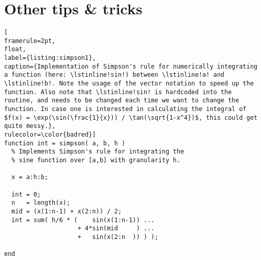 \newpage
\section{Other tips \& tricks}

%
%
%


\begin{lstlisting}[
framerule=2pt,
float,
label={listing:simpson1},
caption={Implementation of Simpson's rule for numerically integrating a function (here: \lstinline!sin!) between \lstinline!a! and \lstinline!b!. Note the usage of the vector notation to speed up the function. Also note that \lstinline!sin! is hardcoded into the routine, and needs to be changed each time we want to change the function. In case one is interested in calculating the integral of $f(x) = \exp(\sin(\frac{1}{x})) / \tan(\sqrt{1-x^4})$, this could get quite messy.},
rulecolor=\color{badred}]
function int = simpson( a, b, h )
  % Implements Simpson's rule for integrating the
  % sine function over [a,b] with granularity h.

  x = a:h:b;

  int = 0;
  n   = length(x);
  mid = (x(1:n-1) + x(2:n)) / 2;
  int = sum( h/6 * (    sin(x(1:n-1)) ...
                    + 4*sin(mid     ) ...
                    +   sin(x(2:n  )) ) );

end
\end{lstlisting}

